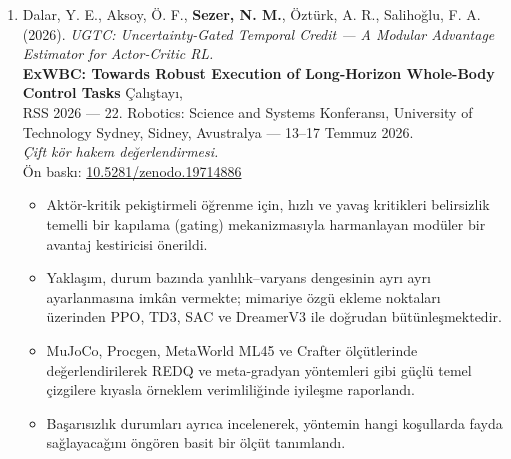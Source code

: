 \documentclass[11pt,a4paper]{article}
\begin{document}
\begin{enumerate}[leftmargin=*, itemsep=0.35em, topsep=2pt]
    \item Dalar, Y. E., Aksoy, Ö. F., \textbf{Sezer, N. M.}, Öztürk, A. R., Salihoğlu, F. A. (2026). \textit{UGTC: Uncertainty-Gated Temporal Credit --- A Modular Advantage Estimator for Actor-Critic RL.} \\
    \textbf{ExWBC: Towards Robust Execution of Long-Horizon Whole-Body Control Tasks} Çalıştayı, \\
    RSS 2026 --- 22. Robotics: Science and Systems Konferansı, University of Technology Sydney, Sidney, Avustralya --- 13--17 Temmuz 2026. \\
    \textit{Çift kör hakem değerlendirmesi.} \\
    Ön baskı: \href{https://doi.org/10.5281/zenodo.19714886}{10.5281/zenodo.19714886}
    \begin{itemize}
        \item Aktör-kritik pekiştirmeli öğrenme için, hızlı ve yavaş kritikleri belirsizlik temelli bir kapılama (gating) mekanizmasıyla harmanlayan modüler bir avantaj kestiricisi önerildi.
        \item Yaklaşım, durum bazında yanlılık--varyans dengesinin ayrı ayrı ayarlanmasına imkân vermekte; mimariye özgü ekleme noktaları üzerinden PPO, TD3, SAC ve DreamerV3 ile doğrudan bütünleşmektedir.
        \item MuJoCo, Procgen, MetaWorld ML45 ve Crafter ölçütlerinde değerlendirilerek REDQ ve meta-gradyan yöntemleri gibi güçlü temel çizgilere kıyasla örneklem verimliliğinde iyileşme raporlandı.
        \item Başarısızlık durumları ayrıca incelenerek, yöntemin hangi koşullarda fayda sağlayacağını öngören basit bir ölçüt tanımlandı.
    \end{itemize}
\end{enumerate}
\end{document}
